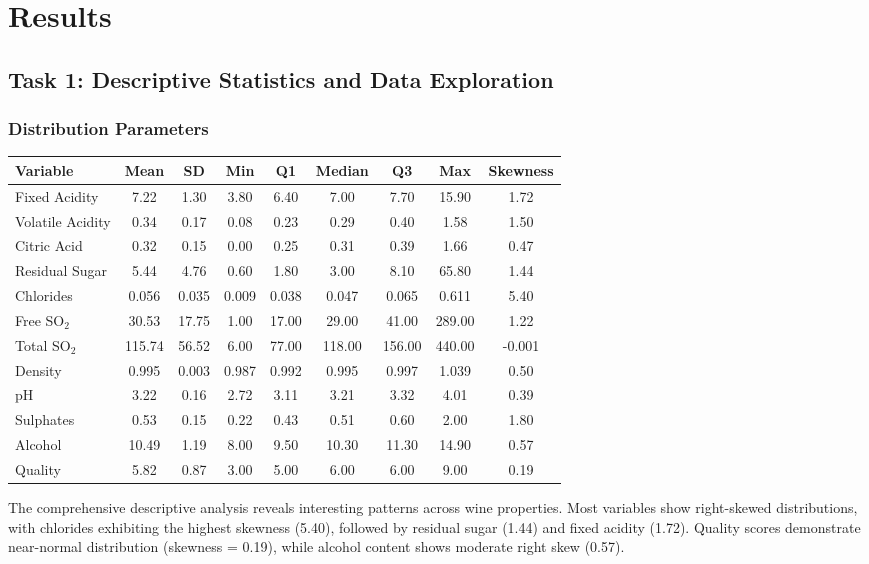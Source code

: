 \chapter{Results}

\section{Task 1: Descriptive Statistics and Data Exploration}

\subsection{Distribution Parameters}

\begin{longtable}{|l|c|c|c|c|c|c|c|c|}
	\hline
	\textbf{Variable} & \textbf{Mean} & \textbf{SD} & \textbf{Min} & \textbf{Q1} & \textbf{Median} & \textbf{Q3} & \textbf{Max} & \textbf{Skewness} \\
	\hline
	Fixed Acidity & 7.22 & 1.30 & 3.80 & 6.40 & 7.00 & 7.70 & 15.90 & 1.72 \\
	\hline
	Volatile Acidity & 0.34 & 0.17 & 0.08 & 0.23 & 0.29 & 0.40 & 1.58 & 1.50 \\
	\hline
	Citric Acid & 0.32 & 0.15 & 0.00 & 0.25 & 0.31 & 0.39 & 1.66 & 0.47 \\
	\hline
	Residual Sugar & 5.44 & 4.76 & 0.60 & 1.80 & 3.00 & 8.10 & 65.80 & 1.44 \\
	\hline
	Chlorides & 0.056 & 0.035 & 0.009 & 0.038 & 0.047 & 0.065 & 0.611 & 5.40 \\
	\hline
	Free SO$_2$ & 30.53 & 17.75 & 1.00 & 17.00 & 29.00 & 41.00 & 289.00 & 1.22 \\
	\hline
	Total SO$_2$ & 115.74 & 56.52 & 6.00 & 77.00 & 118.00 & 156.00 & 440.00 & -0.001 \\
	\hline
	Density & 0.995 & 0.003 & 0.987 & 0.992 & 0.995 & 0.997 & 1.039 & 0.50 \\
	\hline
	pH & 3.22 & 0.16 & 2.72 & 3.11 & 3.21 & 3.32 & 4.01 & 0.39 \\
	\hline
	Sulphates & 0.53 & 0.15 & 0.22 & 0.43 & 0.51 & 0.60 & 2.00 & 1.80 \\
	\hline
	Alcohol & 10.49 & 1.19 & 8.00 & 9.50 & 10.30 & 11.30 & 14.90 & 0.57 \\
	\hline
	Quality & 5.82 & 0.87 & 3.00 & 5.00 & 6.00 & 6.00 & 9.00 & 0.19 \\
	\hline
\end{longtable}

The comprehensive descriptive analysis reveals interesting patterns across wine properties. Most variables show right-skewed distributions, with chlorides exhibiting the highest skewness (5.40), followed by residual sugar (1.44) and fixed acidity (1.72). Quality scores demonstrate near-normal distribution (skewness = 0.19), while alcohol content shows moderate right skew (0.57).

